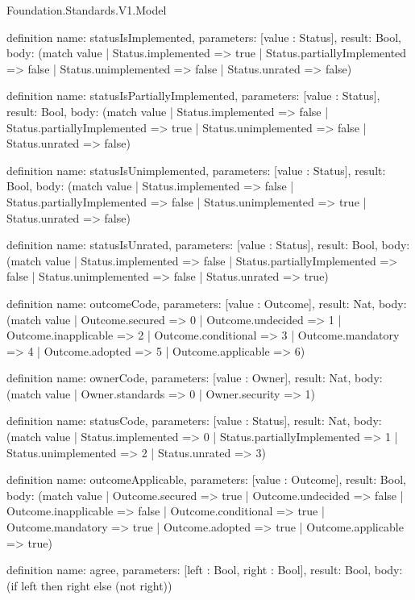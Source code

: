 \begin{lexlean}{Foundation.Standards.V1.Model}
\begin{semanticmodule}
definition{
  name: statusIsImplemented,
  parameters: [value : Status],
  result: Bool,
  body: (match value
    | Status.implemented => true
    | Status.partiallyImplemented => false
    | Status.unimplemented => false
    | Status.unrated => false)
}

definition{
  name: statusIsPartiallyImplemented,
  parameters: [value : Status],
  result: Bool,
  body: (match value
    | Status.implemented => false
    | Status.partiallyImplemented => true
    | Status.unimplemented => false
    | Status.unrated => false)
}

definition{
  name: statusIsUnimplemented,
  parameters: [value : Status],
  result: Bool,
  body: (match value
    | Status.implemented => false
    | Status.partiallyImplemented => false
    | Status.unimplemented => true
    | Status.unrated => false)
}

definition{
  name: statusIsUnrated,
  parameters: [value : Status],
  result: Bool,
  body: (match value
    | Status.implemented => false
    | Status.partiallyImplemented => false
    | Status.unimplemented => false
    | Status.unrated => true)
}

definition{
  name: outcomeCode,
  parameters: [value : Outcome],
  result: Nat,
  body: (match value
    | Outcome.secured => 0
    | Outcome.undecided => 1
    | Outcome.inapplicable => 2
    | Outcome.conditional => 3
    | Outcome.mandatory => 4
    | Outcome.adopted => 5
    | Outcome.applicable => 6)
}

definition{
  name: ownerCode,
  parameters: [value : Owner],
  result: Nat,
  body: (match value | Owner.standards => 0 | Owner.security => 1)
}

definition{
  name: statusCode,
  parameters: [value : Status],
  result: Nat,
  body: (match value
    | Status.implemented => 0
    | Status.partiallyImplemented => 1
    | Status.unimplemented => 2
    | Status.unrated => 3)
}

definition{
  name: outcomeApplicable,
  parameters: [value : Outcome],
  result: Bool,
  body: (match value
    | Outcome.secured => true
    | Outcome.undecided => false
    | Outcome.inapplicable => false
    | Outcome.conditional => true
    | Outcome.mandatory => true
    | Outcome.adopted => true
    | Outcome.applicable => true)
}

definition{
  name: agree,
  parameters: [left : Bool, right : Bool],
  result: Bool,
  body: (if left then right else (not right))
}


\end{semanticmodule}
\end{lexlean}
